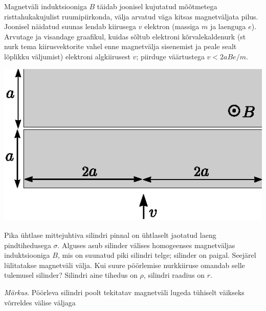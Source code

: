 \documentclass[10pt, twoside]{article}
\begin{document}
{%

Magnetväli induktsiooniga $B$ täidab joonisel kujutatud mõõtmetega risttahukakujulist ruumipiirkonda, välja arvatud väga kitsas magnetväljata pilus.
Joonisel näidatud suunas lendab kiirusega $v$ elektron (massiga $m$ ja laenguga $e$). Arvutage ja visandage graafikul, kuidas sõltub elektroni kõrvalekaldenurk (st nurk tema kiirusvektorite vahel enne magnetvälja sisenemist ja peale sealt lõplikku väljumist) elektroni algkiirusest $v$; piirduge väärtustega $v<2aBe/m$.
\begin{center}
\includegraphics[width=0.5\linewidth]{2010-v2g-09-elektron.eps}
\end{center}
\probend
\bigskip


Pika ühtlase mittejuhtiva silindri pinnal on ühtlaselt jaotatud laeng pindtihedusega $\sigma$. Alguses asub silinder välises homogeenses magnetväljas induktsiooniga $B$, mis on suunatud piki silindri telge; silinder on paigal. Seejärel lülitatakse magnetväli välja. Kui suure pöörlemise nurkkiiruse omandab selle tulemusel silinder? Silindri aine tihedus on $\rho$, silindri raadius on $r$. 

\emph{Märkus}. Pöörleva silindri poolt tekitatav magnetväli lugeda tühiselt väikseks võrreldes välise väljaga
\probend
\bigskip
\newpage\subsection{\protect{}}


}
\end{document}
